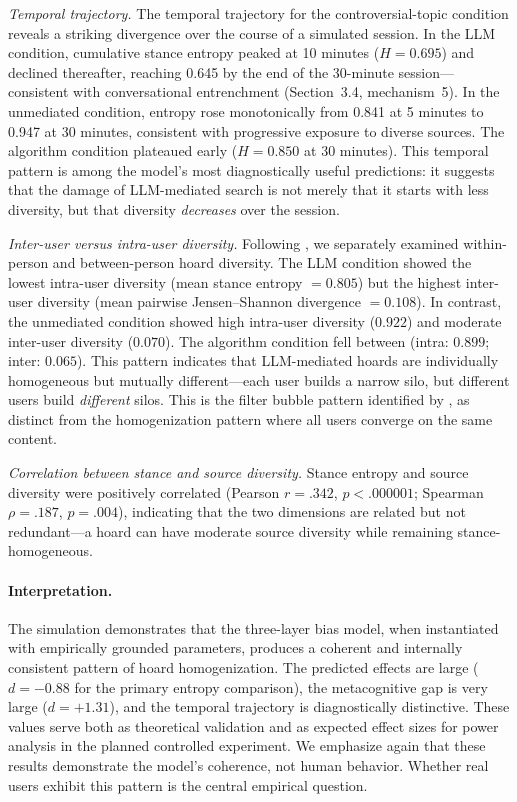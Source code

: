 \documentclass[12pt,a4paper]{article}
\begin{document}
\emph{Temporal trajectory.}
The temporal trajectory for the controversial-topic condition reveals a striking divergence over the course of a simulated session.
In the LLM condition, cumulative stance entropy peaked at 10 minutes ($H = 0.695$) and declined thereafter, reaching 0.645 by the end of the 30-minute session---consistent with conversational entrenchment (Section~3.4, mechanism~5).
In the unmediated condition, entropy rose monotonically from 0.841 at 5 minutes to 0.947 at 30 minutes, consistent with progressive exposure to diverse sources.
The algorithm condition plateaued early ($H = 0.850$ at 30 minutes).
This temporal pattern is among the model's most diagnostically useful predictions: it suggests that the damage of LLM-mediated search is not merely that it starts with less diversity, but that diversity \emph{decreases} over the session.

\emph{Inter-user versus intra-user diversity.}
Following \citet{Anwar2024}, we separately examined within-person and between-person hoard diversity.
The LLM condition showed the lowest intra-user diversity (mean stance entropy $= 0.805$) but the highest inter-user diversity (mean pairwise Jensen--Shannon divergence $= 0.108$).
In contrast, the unmediated condition showed high intra-user diversity ($0.922$) and moderate inter-user diversity ($0.070$).
The algorithm condition fell between (intra: $0.899$; inter: $0.065$).
This pattern indicates that LLM-mediated hoards are individually homogeneous but mutually different---each user builds a narrow silo, but different users build \emph{different} silos.
This is the filter bubble pattern identified by \citet{Anwar2024}, as distinct from the homogenization pattern where all users converge on the same content.

\emph{Correlation between stance and source diversity.}
Stance entropy and source diversity were positively correlated (Pearson $r = .342$, $p < .000001$; Spearman $\rho = .187$, $p = .004$), indicating that the two dimensions are related but not redundant---a hoard can have moderate source diversity while remaining stance-homogeneous.

\paragraph{Interpretation.}
The simulation demonstrates that the three-layer bias model, when instantiated with empirically grounded parameters, produces a coherent and internally consistent pattern of hoard homogenization.
The predicted effects are large ($d = -0.88$ for the primary entropy comparison), the metacognitive gap is very large ($d = +1.31$), and the temporal trajectory is diagnostically distinctive.
These values serve both as theoretical validation and as expected effect sizes for power analysis in the planned controlled experiment.
We emphasize again that these results demonstrate the model's coherence, not human behavior.
Whether real users exhibit this pattern is the central empirical question.
\end{document}
